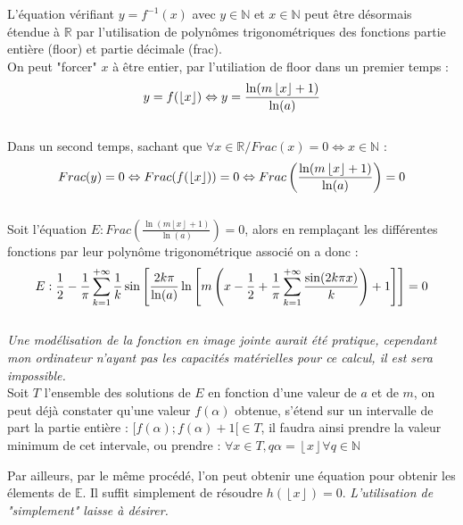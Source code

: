 \documentclass{article}
\begin{document}
L'équation vérifiant $y=f^{-1}(x)$ avec $y\in\mathbb{N}$ et $x\in\mathbb{N}$ peut être désormais étendue à $\mathbb{R}$ par l'utilisation de polynômes trigonométriques des fonctions partie entière (floor) et partie décimale (frac).\\
On peut "forcer" $x$ à être entier, par l'utiliation de floor dans un premier temps :\\
\begin{equation}
y = f(\left\lfloor x \right\rfloor) \Leftrightarrow y = \frac{\ln(m\left\lfloor x \right\rfloor+1)}{\ln(a)}\notag
\end{equation}\\
Dans un second temps, sachant que $\forall x \in\mathbb{R}/ Frac(x)=0 \Leftrightarrow x\in\mathbb{N}$ :\\
\begin{equation}
Frac(y)=0 \Leftrightarrow Frac(f(\left\lfloor x \right\rfloor)) = 0 \Leftrightarrow Frac\left(\frac{\ln(m\left\lfloor x \right\rfloor+1)}{\ln(a)}\right)=0\notag
\end{equation}\\
Soit l'équation $E : Frac\left(\frac{\ln(m\left\lfloor x \right\rfloor+1)}{\ln(a)}\right)=0$, alors en remplaçant les différentes fonctions par leur polynôme trigonométrique associé on a donc :\\
\begin{equation}
E : \frac{1}{2}-\frac{1}{\pi}\sum_{k=1}^{+\infty}\frac{1}{k}\sin\left[\frac{2k\pi}{\ln(a)}\ln\left[m\left(x-\frac{1}{2}+\frac{1}{\pi}\sum_{k=1}^{+\infty}\frac{\sin(2k\pi x)}{k}\right)+1\right]\right]=0\notag
\end{equation}\\
\emph{Une modélisation de la fonction en image jointe aurait été pratique, cependant mon ordinateur n'ayant pas les capacités matérielles pour ce calcul, il est sera impossible.}\\
Soit $T$ l'ensemble des solutions de $E$ en fonction d'une valeur de $a$ et de $m$, on peut déjà constater qu'une valeur $f(\alpha)$ obtenue, s'étend sur un intervalle de part la partie entière : $[f(\alpha) ; f(\alpha)+1[ \in T$, il faudra ainsi prendre la valeur minimum de cet intervale, ou prendre : $\forall x\in T, q\alpha = \left\lfloor x \right\rfloor \forall q\in\mathbb{N}$

Par ailleurs, par le même procédé, l'on peut obtenir une équation pour obtenir les élements de $\mathbb{E}$. Il suffit simplement de résoudre $h(\left\lfloor x \right\rfloor) = 0$. \emph{L'utilisation de "simplement" laisse à désirer.}\\
\end{document}
